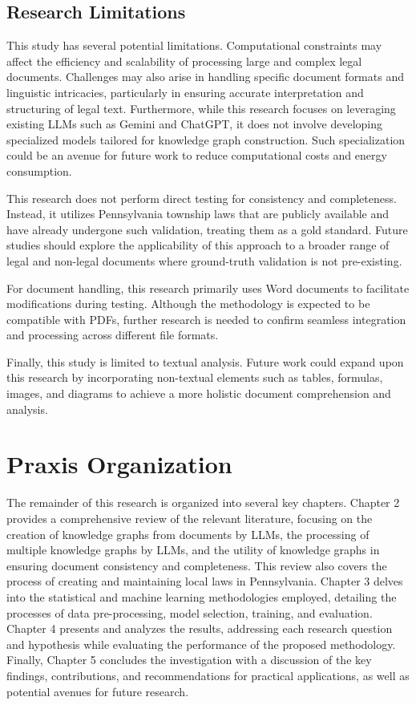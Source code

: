 \subsection{Research Limitations}
This study has several potential limitations. Computational constraints may affect the efficiency and scalability of processing large and complex legal documents. Challenges may also arise in handling specific document formats and linguistic intricacies, particularly in ensuring accurate interpretation and structuring of legal text. Furthermore, while this research focuses on leveraging existing LLMs such as Gemini and ChatGPT, it does not involve developing specialized models tailored for knowledge graph construction. Such specialization could be an avenue for future work to reduce computational costs and energy consumption.

This research does not perform direct testing for consistency and completeness. Instead, it utilizes Pennsylvania township laws that are publicly available and have already undergone such validation, treating them as a gold standard. Future studies should explore the applicability of this approach to a broader range of legal and non-legal documents where ground-truth validation is not pre-existing.

For document handling, this research primarily uses Word documents to facilitate modifications during testing. Although the methodology is expected to be compatible with PDFs, further research is needed to confirm seamless integration and processing across different file formats.

Finally, this study is limited to textual analysis. Future work could expand upon this research by incorporating non-textual elements such as tables, formulas, images, and diagrams to achieve a more holistic document comprehension and analysis.

\section{Praxis Organization}

The remainder of this research is organized into several key chapters. Chapter 2 provides a comprehensive review of the relevant literature, focusing on the creation of knowledge graphs from documents by LLMs, the processing of multiple knowledge graphs by LLMs, and the utility of knowledge graphs in ensuring document consistency and completeness. This review also covers the process of creating and maintaining local laws in Pennsylvania. Chapter 3 delves into the statistical and machine learning methodologies employed, detailing the processes of data pre-processing, model selection, training, and evaluation. Chapter 4 presents and analyzes the results, addressing each research question and hypothesis while evaluating the performance of the proposed methodology. Finally, Chapter 5 concludes the investigation with a discussion of the key findings, contributions, and recommendations for practical applications, as well as potential avenues for future research.
